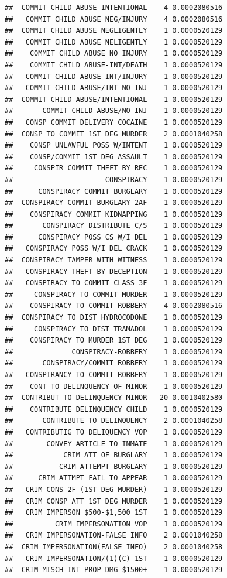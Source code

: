 \documentclass[]{book}
\begin{document}
\begin{verbatim}
##  COMMIT CHILD ABUSE INTENTIONAL    4 0.0002080516
##   COMMIT CHILD ABUSE NEG/INJURY    4 0.0002080516
##  COMMIT CHILD ABUSE NEGLIGENTLY    1 0.0000520129
##   COMMIT CHILD ABUSE NELIGENTLY    1 0.0000520129
##    COMMIT CHILD ABUSE NO INJURY    1 0.0000520129
##    COMMIT CHILD ABUSE-INT/DEATH    1 0.0000520129
##   COMMIT CHILD ABUSE-INT/INJURY    1 0.0000520129
##   COMMIT CHILD ABUSE/INT NO INJ    1 0.0000520129
##  COMMIT CHILD ABUSE/INTENTIONAL    1 0.0000520129
##       COMMIT CHILD ABUSE/NO INJ    1 0.0000520129
##   CONSP COMMIT DELIVERY COCAINE    1 0.0000520129
##  CONSP TO COMMIT 1ST DEG MURDER    2 0.0001040258
##    CONSP UNLAWFUL POSS W/INTENT    1 0.0000520129
##    CONSP/COMMIT 1ST DEG ASSAULT    1 0.0000520129
##     CONSPIR COMMIT THEFT BY REC    1 0.0000520129
##                      CONSPIRACY    1 0.0000520129
##      CONSPIRACY COMMIT BURGLARY    1 0.0000520129
##  CONSPIRACY COMMIT BURGLARY 2AF    1 0.0000520129
##    CONSPIRACY COMMIT KIDNAPPING    1 0.0000520129
##       CONSPIRACY DISTRIBUTE C/S    1 0.0000520129
##      CONSPIRACY POSS CS W/I DEL    1 0.0000520129
##   CONSPIRACY POSS W/I DEL CRACK    1 0.0000520129
##  CONSPIRACY TAMPER WITH WITNESS    1 0.0000520129
##   CONSPIRACY THEFT BY DECEPTION    1 0.0000520129
##   CONSPIRACY TO COMMIT CLASS 3F    1 0.0000520129
##     CONSPIRACY TO COMMIT MURDER    1 0.0000520129
##    CONSPIRACY TO COMMIT ROBBERY    4 0.0002080516
##  CONSPIRACY TO DIST HYDROCODONE    1 0.0000520129
##     CONSPIRACY TO DIST TRAMADOL    1 0.0000520129
##    CONSPIRACY TO MURDER 1ST DEG    1 0.0000520129
##              CONSPIRACY-ROBBERY    1 0.0000520129
##       CONSPIRACY/COMMIT ROBBERY    1 0.0000520129
##   CONSPIRANCY TO COMMIT ROBBERY    1 0.0000520129
##    CONT TO DELINQUENCY OF MINOR    1 0.0000520129
##  CONTRIBUT TO DELINQUENCY MINOR   20 0.0010402580
##    CONTRIBUTE DELINQUENCY CHILD    1 0.0000520129
##       CONTRIBUTE TO DELINQUENCY    2 0.0001040258
##   CONTRIBUTIG TO DELIQUENCY VOP    1 0.0000520129
##        CONVEY ARTICLE TO INMATE    1 0.0000520129
##            CRIM ATT OF BURGLARY    1 0.0000520129
##           CRIM ATTEMPT BURGLARY    1 0.0000520129
##      CRIM ATTMPT FAIL TO APPEAR    1 0.0000520129
##   CRIM CONS 2F (1ST DEG MURDER)    1 0.0000520129
##   CRIM CONSP ATT 1ST DEG MURDER    1 0.0000520129
##   CRIM IMPERSON $500-$1,500 1ST    1 0.0000520129
##          CRIM IMPERSONATION VOP    1 0.0000520129
##   CRIM IMPERSONATION-FALSE INFO    2 0.0001040258
##  CRIM IMPERSONATION(FALSE INFO)    2 0.0001040258
##   CRIM IMPERSONATION/(1)(C)-1ST    1 0.0000520129
##  CRIM MISCH INT PROP DMG $1500+    1 0.0000520129

\end{verbatim}
\end{document}
